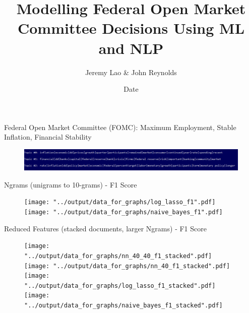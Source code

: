 \documentclass{beamer}
\title{Modelling Federal Open Market Committee Decisions Using ML and NLP}
\author{Jeremy Lao \& John Reynolds}
\institute[NYU]
{
Department of Computer Science\\
Courant Institute of Mathematical Sciences, NYU\\
  \texttt{}
}
\date{Date}
\begin{document}
\begin{frame}
\titlepage
\end{frame}



\begin{frame}
Federal Open Market Committee (FOMC): Maximum Employment, Stable Inflation, Financial Stability
\vspace{-3mm}
\begin{figure}[H]
\includegraphics[width=1\textwidth]{../output/data_for_graphs/Topic-Model-3-topics.PNG}
\end{figure}
\vspace{-5mm}

Ngrams (unigrams to 10-grams) - F1 Score
\vspace{-1mm}
\begin{figure}[H]
\begin{center}
\texttt{[image: "../output/data\_for\_graphs/log\_lasso\_f1".pdf]}
\texttt{[image: "../output/data\_for\_graphs/naive\_bayes\_f1".pdf]}
\end{center}
\end{figure}
\vspace{-5mm}

Reduced Features (stacked documents, larger Ngrams) - F1 Score
\vspace{-1mm}
\begin{figure}[H]
\texttt{[image: "../output/data\_for\_graphs/nn\_40\_40\_f1\_stacked".pdf]}
\texttt{[image: "../output/data\_for\_graphs/nn\_40\_f1\_stacked".pdf]}
\texttt{[image: "../output/data\_for\_graphs/log\_lasso\_f1\_stacked".pdf]}
\texttt{[image: "../output/data\_for\_graphs/naive\_bayes\_f1\_stacked".pdf]}
\end{figure}

\end{frame}
\end{document}
